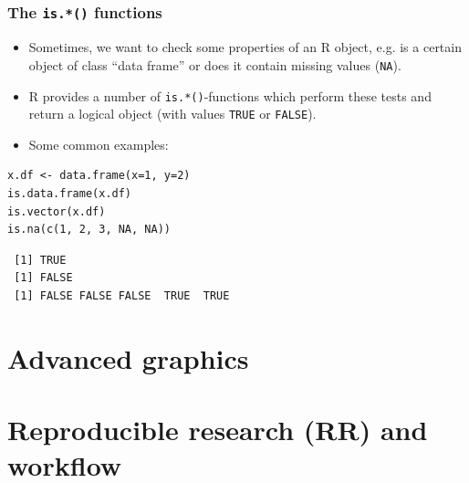 \documentclass[bigger]{beamer}
\begin{document}
\subsection{}
\begin{frame}[fragile,label=slide_is_function]
\frametitle{The \texttt{is.*()} functions}
\label{sec-7-1-1}

\begin{itemize}
\item Sometimes, we want to check some properties of an R object, e.g. is a
      certain object of class \enquote{data frame} or does it contain missing values
      (\texttt{NA}).
\item R provides a number of \texttt{is.*()}-functions which perform these tests and
      return a logical object (with values \texttt{TRUE} or \texttt{FALSE}).
\item Some common examples:
\end{itemize}


\lstset{language=R}
\begin{lstlisting}
x.df <- data.frame(x=1, y=2)
is.data.frame(x.df)
is.vector(x.df)
is.na(c(1, 2, 3, NA, NA))
\end{lstlisting}

\begin{verbatim}
 [1] TRUE
 [1] FALSE
 [1] FALSE FALSE FALSE  TRUE  TRUE
\end{verbatim}
\end{frame}
\section{Advanced graphics}
\label{sec-8}
\section{Reproducible research (RR) and workflow}
\label{sec-9}
\end{document}
